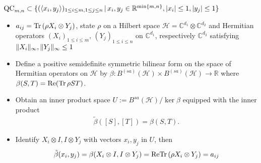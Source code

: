 \begin{frame}
\begin{block}{$ \textup{QC}_{m,n} \subset \{ (\langle x_i,y_j \rangle)_{1 \le i \le m, 1 \le j \le n} \,| \, x_i,y_j \in \mathbb{R}^{ \min \{m,n \} }, \vert x_i  \vert \le 1, \vert y_j \vert \le 1  \} $}
	\begin{itemize}
		\item<1-> $ a_{ij} = \textup{Tr} \, {(\rho X_i \otimes Y_j)}  $, state $ \rho $ on a Hilbert space $ \mathcal{H} = \mathbb{C}^{d_1} \otimes\mathbb{C}^{d_2} $ and Hermitian operators $ (X_i)_{1 \le i \le  m}, \, (Y_j)_{1 \le i\le n} $ on $ \mathbb{C}^{d_1} $, respectively $ \mathbb{C}^{d_2} $ satisfying $  \Vert {X_i} \Vert_{\infty},  \Vert {Y_j} \Vert_{\infty} \le 1 $
		\item<2-> Define a positive semidefinite symmetric bilinear form on the space of Hermitian operators on $ \mathcal{H} $ by 
		$ \beta: B^{(sa)}(\mathcal{H}) \times B^{(sa)}(\mathcal{H}) \to \mathbb{R} $ where $ \beta(S,T) =\textup{Re}( \textup{Tr} \, {\rho ST} ) $.
		\item<3-> Obtain an inner product space $ U := B^{sa}(\mathcal{H}) / \ker \beta$ equipped with the inner product 
		\begin{align*}
			\tilde{\beta}([S],[T]) = \beta(S,T).
		\end{align*}
		\item<4-> Identify $ X_i \otimes I,I \otimes Y_j $ with vectors $ x_i,y_j $ in $ U $, then 
		\begin{align*}
			\tilde{\beta}(x_i,y_j) = \beta(X_i \otimes I,I \otimes Y_j) = \textup{Re} \textup{Tr} \, {(\rho X_i \otimes Y_j)}  = a_{ij}
		\end{align*}
	\end{itemize}
\end{block}
\end{frame}

